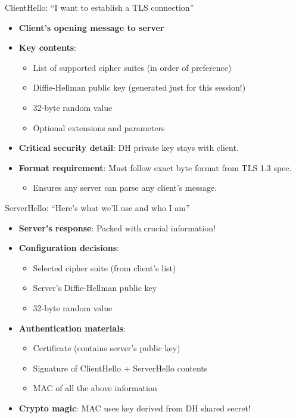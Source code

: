 \documentclass[aspectratio=169, lualatex, handout]{beamer}
\begin{document}
\begin{frame}{ClientHello: ``I want to establish a TLS connection''}
	\begin{itemize}[<+->]
		\item \textbf{Client's opening message to server}
		\item \textbf{Key contents}:
		      \begin{itemize}
			      \item List of supported cipher suites (in order of preference)
			      \item Diffie-Hellman public key (generated just for this session!)
			      \item 32-byte random value
			      \item Optional extensions and parameters
		      \end{itemize}
		\item \textbf{Critical security detail}: DH private key stays with client.
		\item \textbf{Format requirement}: Must follow exact byte format from TLS 1.3 spec.
		      \begin{itemize}
			      \item Ensures any server can parse any client's message.
		      \end{itemize}
	\end{itemize}
\end{frame}

\begin{frame}{ServerHello: ``Here's what we'll use and who I am''}
	\begin{itemize}[<+->]
		\item \textbf{Server's response}: Packed with crucial information!
		\item \textbf{Configuration decisions}:
		      \begin{itemize}
			      \item Selected cipher suite (from client's list)
			      \item Server's Diffie-Hellman public key
			      \item 32-byte random value
		      \end{itemize}
		\item \textbf{Authentication materials}:
		      \begin{itemize}
			      \item Certificate (contains server's public key)
			      \item Signature of ClientHello + ServerHello contents
			      \item MAC of all the above information
		      \end{itemize}
		\item \textbf{Crypto magic}: MAC uses key derived from DH shared secret!
	\end{itemize}
\end{frame}
\end{document}
